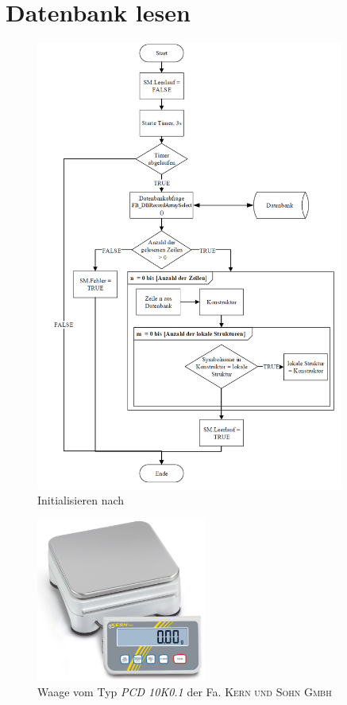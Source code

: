 \chapter{Datenbank lesen }

\begin{figure}[htb]
\centering		\includegraphics[width=0.90\textwidth]{Pictures/DB_lesen.png}
\caption{Initialisieren nach \citep{Nuerenberg2015}}
\label{fig:}
\end{figure}

\begin{figure}[htb]
\centering		\includegraphics[width=0.50\textwidth]{Pictures/Waage.png}
\caption{Waage vom Typ \textit{PCD 10K0.1} der Fa. \textsc{Kern und Sohn Gmbh}}
\label{fig:}
\end{figure}

